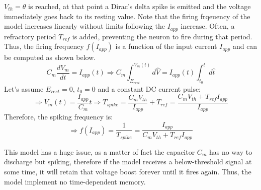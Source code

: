 \(V_{th}=\theta\) is reached, at that point a Dirac's delta spike is emitted and the voltage
immediately goes back to its resting value. Note that the firing frqeuency of the model increases
linearly without limits following the \(I_{app}\) increase. Often, a refractory period \(T_{ref}\)
is added, preventing the neuron to fire during that period. Thus, the firing frequency \(f(I_{app})\) is
a function of the input current \(I_{app}\) and can be computed as shown below.
\begin{equation*}
    C_{m}\frac{dV_{m}}{dt}=I_{app}(t)
    \Rightarrow
    C_{m}\int_{E_{rest}}^{V_{m}(t)}d\hat{V}=I_{app}(t)\int_{t_{0}}^{t}d\hat{t}
\end{equation*}
Let's assume \(E_{rest}=0\), \(t_{0}=0\) and a constant DC current pulse:
\begin{equation*}
    \Rightarrow
    V_{m}(t)=\frac{I_{app}}{C_{m}}t
    \Rightarrow
    T_{spike}=\frac{C_{m}V_{th}}{I_{app}}+T_{ref}=\frac{C_{m}V_{th}+T_{ref}I_{app}}{I_{app}}
\end{equation*}
Therefore, the spiking frequency is:
\begin{equation*}
    \Rightarrow
    f(I_{app})=\frac{1}{T_{spike}}=\frac{I_{app}}{C_{m}V_{th}+T_{ref}I_{app}}
\end{equation*}
\par
This model has a huge issue, as a matter of fact the capacitor \(C_{m}\) has no way to discharge but spiking,
therefore if the model receives a below-threshold signal at some time, it will retain that voltage boost forever
until it fires again. Thus, the model implement no time-dependent memory.
